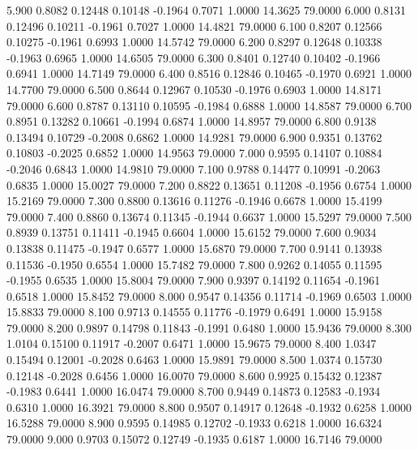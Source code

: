    5.900   0.8082   0.12448   0.10148  -0.1964   0.7071   1.0000  14.3625  79.0000
   6.000   0.8131   0.12496   0.10211  -0.1961   0.7027   1.0000  14.4821  79.0000
   6.100   0.8207   0.12566   0.10275  -0.1961   0.6993   1.0000  14.5742  79.0000
   6.200   0.8297   0.12648   0.10338  -0.1963   0.6965   1.0000  14.6505  79.0000
   6.300   0.8401   0.12740   0.10402  -0.1966   0.6941   1.0000  14.7149  79.0000
   6.400   0.8516   0.12846   0.10465  -0.1970   0.6921   1.0000  14.7700  79.0000
   6.500   0.8644   0.12967   0.10530  -0.1976   0.6903   1.0000  14.8171  79.0000
   6.600   0.8787   0.13110   0.10595  -0.1984   0.6888   1.0000  14.8587  79.0000
   6.700   0.8951   0.13282   0.10661  -0.1994   0.6874   1.0000  14.8957  79.0000
   6.800   0.9138   0.13494   0.10729  -0.2008   0.6862   1.0000  14.9281  79.0000
   6.900   0.9351   0.13762   0.10803  -0.2025   0.6852   1.0000  14.9563  79.0000
   7.000   0.9595   0.14107   0.10884  -0.2046   0.6843   1.0000  14.9810  79.0000
   7.100   0.9788   0.14477   0.10991  -0.2063   0.6835   1.0000  15.0027  79.0000
   7.200   0.8822   0.13651   0.11208  -0.1956   0.6754   1.0000  15.2169  79.0000
   7.300   0.8800   0.13616   0.11276  -0.1946   0.6678   1.0000  15.4199  79.0000
   7.400   0.8860   0.13674   0.11345  -0.1944   0.6637   1.0000  15.5297  79.0000
   7.500   0.8939   0.13751   0.11411  -0.1945   0.6604   1.0000  15.6152  79.0000
   7.600   0.9034   0.13838   0.11475  -0.1947   0.6577   1.0000  15.6870  79.0000
   7.700   0.9141   0.13938   0.11536  -0.1950   0.6554   1.0000  15.7482  79.0000
   7.800   0.9262   0.14055   0.11595  -0.1955   0.6535   1.0000  15.8004  79.0000
   7.900   0.9397   0.14192   0.11654  -0.1961   0.6518   1.0000  15.8452  79.0000
   8.000   0.9547   0.14356   0.11714  -0.1969   0.6503   1.0000  15.8833  79.0000
   8.100   0.9713   0.14555   0.11776  -0.1979   0.6491   1.0000  15.9158  79.0000
   8.200   0.9897   0.14798   0.11843  -0.1991   0.6480   1.0000  15.9436  79.0000
   8.300   1.0104   0.15100   0.11917  -0.2007   0.6471   1.0000  15.9675  79.0000
   8.400   1.0347   0.15494   0.12001  -0.2028   0.6463   1.0000  15.9891  79.0000
   8.500   1.0374   0.15730   0.12148  -0.2028   0.6456   1.0000  16.0070  79.0000
   8.600   0.9925   0.15432   0.12387  -0.1983   0.6441   1.0000  16.0474  79.0000
   8.700   0.9449   0.14873   0.12583  -0.1934   0.6310   1.0000  16.3921  79.0000
   8.800   0.9507   0.14917   0.12648  -0.1932   0.6258   1.0000  16.5288  79.0000
   8.900   0.9595   0.14985   0.12702  -0.1933   0.6218   1.0000  16.6324  79.0000
   9.000   0.9703   0.15072   0.12749  -0.1935   0.6187   1.0000  16.7146  79.0000
